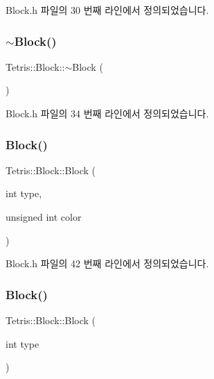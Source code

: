 Block.\+h 파일의 30 번째 라인에서 정의되었습니다.

\mbox{\label{class_tetris_1_1_block_a20012167d55a996d56825d99082419c6}} 
\subsubsection{\texorpdfstring{$\sim$\+Block()}{~Block()}\hspace{0.1cm}{\footnotesize\ttfamily [1/2]}}
{\footnotesize\ttfamily Tetris\+::\+Block\+::$\sim$\+Block (\begin{DoxyParamCaption}{ }\end{DoxyParamCaption})\hspace{0.3cm}{\ttfamily [inline]}}



Block.\+h 파일의 34 번째 라인에서 정의되었습니다.

\mbox{\label{class_tetris_1_1_block_a82c3ff96d106bd1da7b32f2addd7db7f}} 
\subsubsection{\texorpdfstring{Block()}{Block()}\hspace{0.1cm}{\footnotesize\ttfamily [2/4]}}
{\footnotesize\ttfamily Tetris\+::\+Block\+::\+Block (\begin{DoxyParamCaption}\item[{int}]{type,  }\item[{unsigned int}]{color }\end{DoxyParamCaption})\hspace{0.3cm}{\ttfamily [inline]}}



Block.\+h 파일의 42 번째 라인에서 정의되었습니다.

\mbox{\label{class_tetris_1_1_block_a1fd0aaff1f4b622c9c7027929c5d4534}} 
\subsubsection{\texorpdfstring{Block()}{Block()}\hspace{0.1cm}{\footnotesize\ttfamily [3/4]}}
{\footnotesize\ttfamily Tetris\+::\+Block\+::\+Block (\begin{DoxyParamCaption}\item[{int}]{type }\end{DoxyParamCaption})\hspace{0.3cm}{\ttfamily [inline]}}

